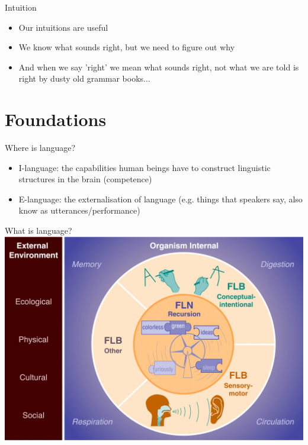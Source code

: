 \documentclass{beamer}
\begin{document}
\begin{frame}{Intuition}
	\begin{itemize}
	\item Our intuitions are useful
	\item We know what sounds right, but we need to figure out why
	\item And when we say 'right' we mean what sounds right, not what we are told is right by dusty old grammar books...
	\end{itemize}


\end{frame}

\section{Foundations}

\begin{frame}{Where is language?}
	\begin{itemize}
		\item I-language: the capabilities human beings have to construct linguistic structures in the brain (competence)
	\item E-language: the externalisation of language (e.g. things that speakers say, also know as utterances/performance)
	\end{itemize}

\end{frame}


\begin{frame}{What is language?}
	\includegraphics[scale=0.25]{FLN.jpg}
	\nocite{hauser2002faculty}
\end{frame}
\end{document}
